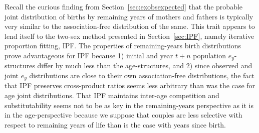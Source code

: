 \label{sec:ipfex}
Recall the curious finding from Section~\ref{sec:exobsexpected} that the
probable joint distribution of births by remaining years of mothers and fathers is typically
very similar to the association-free distribution of the same. This trait
appears to lend itself to the two-sex method presented in Section~\ref{sec:IPF},
namely iterative proportion fitting, IPF. The properties of remaining-years birth 
distributions prove advantageous for IPF because 1) initial and year
$t+n$ population $e_y$-structures differ by much less than the age-structures,
and 2) since observed and joint $e_y$ distributions are close to their own
association-free distributions, the fact that IPF preserves cross-product ratios
seems less arbitrary than was the case for age joint distributions. That IPF
maintains inter-age competition and substitutability seems not to be as key in
the remaining-years perspective as it is in the age-perspective because we suppose
that couples are less selective with respect to remaining years of life than is
the case with years since birth.









